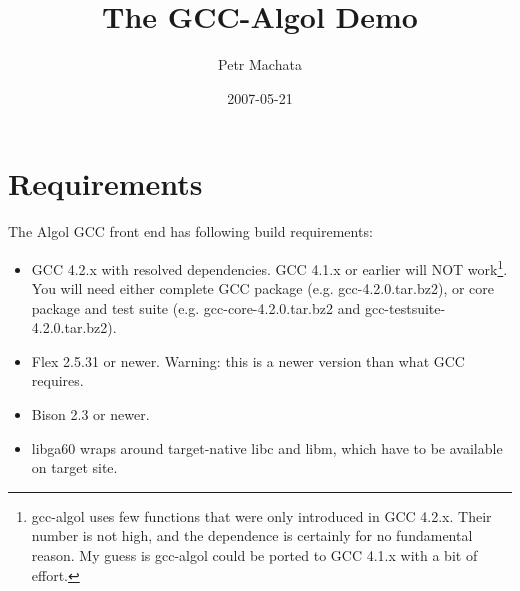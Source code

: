 \documentclass[a4paper,11pt]{article}
\begin{document}
\def\Algol{{\sc Algol}\space}

\def\literal#1{{\sffamily{}#1}}
\def\function#1{{\sffamily{}#1}}
\def\file#1{{\sffamily{}#1}}
\def\option#1{{\sffamily{}#1}}
\def\variable#1{{\sffamily{}#1}}

\def\program#1{{\sffamily\begin{tabbing}#1\end{tabbing}}}
\def\keyw#1{{\sffamily\bfseries {#1}}}
\def\comment#1{{\sffamily\it {#1}}}
\def\litstr#1{{\sffamily\it {#1}}}
\def\ind{\hspace{0.5cm}}
\def\ptr{$-\!\!>$}
\def\xtree{\literal{\keyw{tree}\space}}

\def\note#1{{{\it Note.\space}#1}}
\def\output#1{{\ttfamily\begin{tabbing}#1\end{tabbing}}}

\def\term#1{{\it #1}}


\title{The GCC-Algol Demo}
\author{Petr Machata}
\date{2007-05-21}

\maketitle

\section{Requirements}

The \Algol 60 GCC front end has following build requirements:

\begin{itemize}
\item GCC 4.2.x with resolved dependencies.  GCC 4.1.x or earlier will
  NOT work\footnote{\file{gcc-algol} uses few functions that were only
  introduced in GCC 4.2.x.  Their number is not high, and the
  dependence is certainly for no fundamental reason.  My guess is
  \file{gcc-algol} could be ported to GCC 4.1.x with a bit of
  effort.}.  You will need either complete GCC package
  (e.g. \file{gcc-4.2.0.tar.bz2}), or core package and test suite
  (e.g. \file{gcc-core-4.2.0.tar.bz2} and
  \file{gcc-testsuite-4.2.0.tar.bz2}).
\item Flex 2.5.31 or newer.  Warning: this is a newer version than
  what GCC requires.
\item Bison 2.3 or newer.
\item \file{libga60} wraps around target-native \file{libc} and
  \file{libm}, which have to be available on target site.
\end{itemize}
\end{document}
